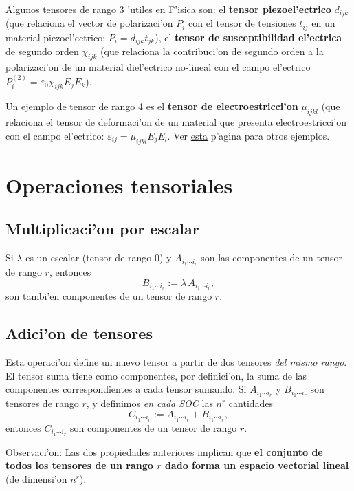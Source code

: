 Algunos tensores de rango 3 'utiles en F'isica son: el \textbf{tensor piezoel'ectrico} $d_{ijk}$ (que relaciona el vector de polarizaci'on $P_i$ con el tensor de tensiones $t_{ij}$ en un material piezoel'ectrico: $P_i=d_{ijk}t_{jk}$), el \textbf{tensor de susceptibilidad el'ectrica} de segundo orden $\chi_{ijk}$ (que relaciona la contribuci'on de segundo orden a la polarizaci'on de un material diel'ectrico no-lineal con el campo el'ectrico $P_i^{(2)}=\varepsilon_0\chi_{ijk}E_jE_k$).

Un ejemplo de tensor de rango 4 es el \textbf{tensor de electroestricci'on} $\mu_{ijkl}$ (que relaciona el tensor de deformaci'on de un material que presenta electroestricci'on con el campo el'ectrico: $\varepsilon_{ij}=\mu_{ijkl}E_jE_l$. Ver \href{http://oldwww.iucr.org/iucr-top/comm/cteach/pamphlets/18/node2.html}{esta} p'agina para otros ejemplos.

\section{Operaciones tensoriales}
\subsection{Multiplicaci'on por escalar}
Si $\lambda$ es un escalar (tensor de rango $0$) y $A_{i_1\cdots i_r}$ son las componentes de un tensor de rango $r$, entonces
\begin{equation}
B_{i_1\cdots i_r}:=\lambda\,A_{i_1\cdots i_r},
\end{equation}
son tambi'en componentes de un tensor de rango $r$.

\subsection{Adici'on de tensores}
Esta operaci'on define un nuevo tensor a partir de dos tensores \textit{del mismo rango}. El tensor suma tiene como componentes, por definici'on, la suma de las componentes correspondientes a cada tensor sumando. Si $A_{i_1\cdots i_r}$ y $B_{i_1\cdots i_r}$ son tensores de rango $r$, y definimos \textit{en cada SOC} las $n^r$ cantidades
\begin{equation}
C_{i_1\cdots i_r}:=A_{i_1\cdots i_r}+B_{i_1\cdots i_r},
\end{equation}
entonces $C_{i_1\cdots i_r}$ son componentes de un tensor de rango $r$.

Observaci'on: Las dos propiedades anteriores implican que \textbf{el conjunto de todos los tensores de un rango $r$ dado forma un espacio vectorial lineal} (de dimensi'on $n^r$).

